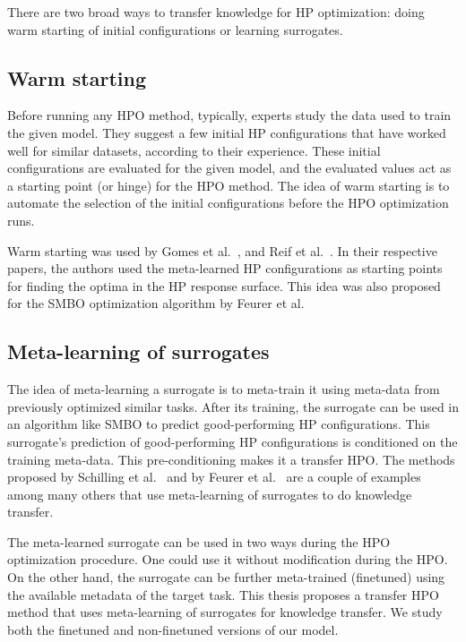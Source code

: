 \documentclass[12pt, twoside, ngerman]{report}
\begin{document}
There are two broad ways to transfer knowledge for HP optimization: doing warm starting of initial configurations or learning surrogates.

\subsection{Warm starting}

Before running any HPO method, typically, experts study the data used to train the given model.
They suggest a few initial HP configurations that have worked well for similar datasets, according to their experience.
These initial configurations are evaluated for the given model, and the evaluated values act as a starting point (or hinge) for the HPO method.
The idea of warm starting is to automate the selection of the initial configurations before the HPO optimization runs.

Warm starting was used by Gomes et al.~\cite{svmhpmetalearnt}, and Reif et al.~\cite{metalearningwarmstartpaper}. In their respective papers, the authors used the meta-learned HP configurations as starting points for finding the optima in the HP response surface.
This idea was also proposed for the SMBO optimization algorithm by Feurer et al.~\cite{Feurer2014UsingMT}


\subsection{Meta-learning of surrogates}

The idea of meta-learning a surrogate is to meta-train it using meta-data from previously optimized similar tasks.
After its training, the surrogate can be used in an algorithm like SMBO to predict good-performing HP configurations.
This surrogate's prediction of good-performing HP configurations is conditioned on the training meta-data. This pre-conditioning makes it a transfer HPO.
The methods proposed by Schilling et al.~\cite{Schilling2016ScalableHO} and by Feurer et al.~\cite{Feurer2018ScalableMF} are a couple of examples among many others that use meta-learning of surrogates to do knowledge transfer.

The meta-learned surrogate can be used in two ways during the HPO optimization procedure.
One could use it without modification during the HPO.
On the other hand, the surrogate can be further meta-trained (finetuned) using the available metadata of the target task.
This thesis proposes a transfer HPO method that uses meta-learning of surrogates for knowledge transfer. We study both the finetuned and non-finetuned versions of our model.
\end{document}
